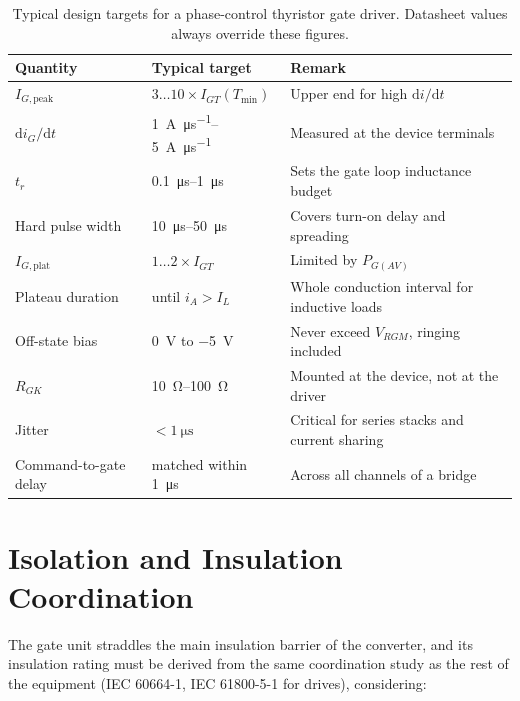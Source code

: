 \documentclass[11pt,a4paper]{article}
\begin{document}
\begin{table}[htbp]
\centering
\caption{Typical design targets for a phase-control thyristor gate driver.
Datasheet values always override these figures.}
\label{tab:targets}
\begin{tabular}{@{}llp{6.4cm}@{}}
\toprule
\textbf{Quantity} & \textbf{Typical target} & \textbf{Remark} \\
\midrule
$I_{G,\text{peak}}$ & $3\dots10\times I_{GT}(T_{\min})$ &
  Upper end for high $\mathrm{d}i/\mathrm{d}t$ \\
$\mathrm{d}i_G/\mathrm{d}t$ & \SIrange{1}{5}{\ampere\per\micro\second} &
  Measured at the device terminals \\
$t_r$ & \SIrange{0.1}{1}{\micro\second} & Sets the gate loop inductance budget \\
Hard pulse width & \SIrange{10}{50}{\micro\second} & Covers turn-on delay and spreading \\
$I_{G,\text{plat}}$ & $1\dots2\times I_{GT}$ & Limited by $P_{G(AV)}$ \\
Plateau duration & until $i_A > I_L$ &
  Whole conduction interval for inductive loads \\
Off-state bias & \SI{0}{\volt} to \SI{-5}{\volt} &
  Never exceed $V_{RGM}$, ringing included \\
$R_{GK}$ & \SIrange{10}{100}{\ohm} & Mounted at the device, not at the driver \\
Jitter & $< \SI{1}{\micro\second}$ &
  Critical for series stacks and current sharing \\
Command-to-gate delay & matched within \SI{1}{\micro\second} &
  Across all channels of a bridge \\
\bottomrule
\end{tabular}
\end{table}

\section{Isolation and Insulation Coordination}

The gate unit straddles the main insulation barrier of the converter, and its
insulation rating must be derived from the same coordination study as the rest of
the equipment (IEC 60664-1, IEC 61800-5-1 for drives), considering:
\end{document}
